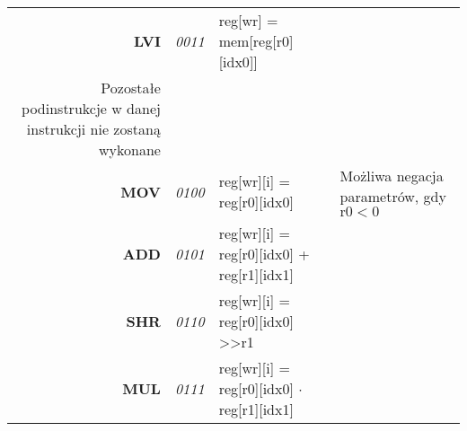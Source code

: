 \begin{landscape}
\begin{longtable}[c]{|r|l|l|l|}
\textbf{LVI}                              & \textit{0011}                     & reg{[}wr{]} = mem{[}reg{[}r0{]}{[}idx0{]}{]}                                                                                                & \begin{tabular}[c]{@{}l@{}}i=3\\ Pozostałe podinstrukcje w danej instrukcji nie zostaną wykonane\end{tabular}                                                                                                                                                                            \\ \hline
\textbf{MOV}                              & \textit{0100}                     & reg{[}wr{]}{[}i{]} = reg{[}r0{]}{[}idx0{]}                                                                                                  & Możliwa negacja parametrów, gdy $\mathrm{r0 < 0}$                                                                                                                                                                                                                                        \\ \hline
\textbf{ADD}                              & \textit{0101}                     & reg{[}wr{]}{[}i{]} = reg{[}r0{]}{[}idx0{]} + reg{[}r1{]}{[}idx1{]}                                                                          &                                                                                                                                                                                                                                                                                          \\ \hline
\textbf{SHR}                              & \textit{0110}                     & reg{[}wr{]}{[}i{]} = reg{[}r0{]}{[}idx0{]} \textgreater{}\textgreater r1                                                                    &                                                                                                                                                                                                                                                                                          \\ \hline
\textbf{MUL}                              & \textit{0111}                     & reg{[}wr{]}{[}i{]} = reg{[}r0{]}{[}idx0{]} $\cdot$ reg{[}r1{]}{[}idx1{]}                                                                    &                                                                                                                                                                                                                                                                                          \\ \hline

\end{longtable}
\end{landscape}
